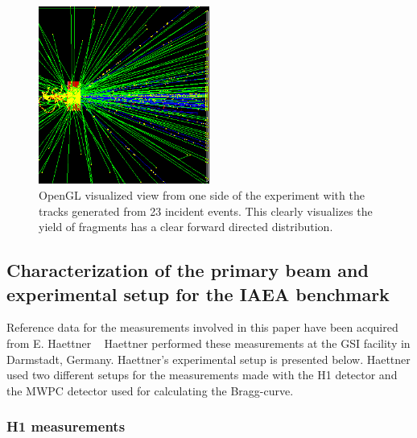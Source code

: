 \begin{figure}[ht] 
\begin{center}
\includegraphics[width=0.5\textwidth]{images/twentyEvents.png}  
\caption{\label{fig:twentyEvents} OpenGL visualized view from one side of the experiment with the tracks generated from 23 incident events. This clearly visualizes the yield of fragments has a clear forward directed distribution.}
\end{center}
\end{figure}


\subsection{Characterization of the primary beam and experimental setup for the
IAEA benchmark}

Reference data for the measurements involved in this paper have been acquired from E. Haettner ~\cite{ehaettner}  Haettner performed these measurements at the GSI facility in Darmstadt, Germany. Haettner's experimental setup is presented below. Haettner used two different setups for the measurements made with the H1 detector and the MWPC detector used for calculating the Bragg-curve.

\subsubsection{H1 measurements}

